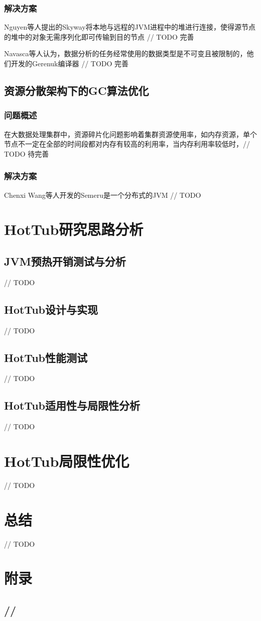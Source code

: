 \documentclass[lang=cn,11pt,a4paper,cite=authoryear]{elegantpaper}
\begin{document}
\subsubsection{解决方案}
Nguyen等人提出的Skyway\cite{DBLP:conf/asplos/NguyenFNXDL18}将本地与远程的JVM进程中的堆进行连接，使得源节点的堆中的对象无需序列化即可传输到目的节点 // TODO 完善

Navasca等人认为，数据分析的任务经常使用的数据类型是不可变且被限制的，他们开发的Gerenuk\cite{DBLP:conf/sosp/NavascaCNDLKX19}编译器 // TODO 完善

\subsection{资源分散架构下的GC算法优化}
\subsubsection{问题概述}
在大数据处理集群中，资源碎片化问题影响着集群资源使用率，如内存资源，单个节点不一定在全部的时间段都对内存有较高的利用率，当内存利用率较低时，// TODO 待完善
\subsubsection{解决方案}
Chenxi Wang等人开发的Semeru\cite{semeru}是一个分布式的JVM // TODO

\section{HotTub研究思路分析}
\subsection{JVM预热开销测试与分析}
// TODO
\subsection{HotTub设计与实现}
// TODO
\subsection{HotTub性能测试}
// TODO
\subsection{HotTub适用性与局限性分析}
// TODO

\section{HotTub局限性优化}
// TODO

\section{总结}
// TODO

\nocite{*}
\cleardoublepage


\appendix
\addappheadtotoc
\section{附录}

\subsection{//}
\end{document}
